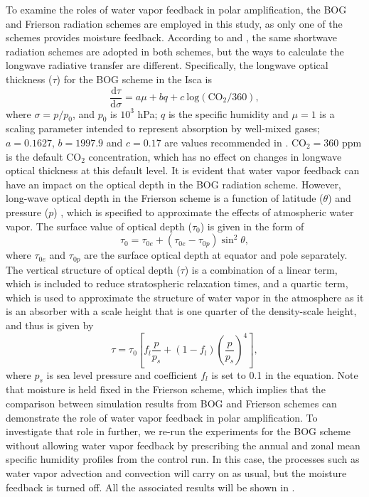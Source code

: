 To examine the roles of water vapor feedback in polar amplification, the BOG and Frierson radiation schemes are employed in this study, as only one of the schemes provides moisture feedback. According to \cite{Byrne2013} and \cite{Frierson2006}, the same shortwave radiation schemes are adopted in both schemes, but the ways to calculate the longwave radiative transfer are different. Specifically, the longwave optical thickness ($\tau$) for the BOG scheme in the Isca is
\begin{equation}\label{eq:bog_tau}
    \frac{\text{d}\tau}{\text{d}\sigma}=a\mu+bq+c~\text{log}(\text{CO}_2/360),
\end{equation}
where $\sigma = p/p_0$, and $p_0$ is $10^3$ hPa; $q$ is the specific humidity and $\mu=1$ is a scaling parameter intended to represent absorption by well-mixed gases; $a=0.1627$, $b=1997.9$ and $c=0.17$ are values recommended in \cite{Vallis2018}. CO$_2=360$ ppm is the default CO$_2$ concentration, which has no effect on changes in longwave optical thickness at this default level. It is evident that water vapor feedback can have an impact on the optical depth in the BOG radiation scheme. However, long-wave optical depth in the Frierson scheme is a function of latitude ($\theta$) and pressure ($p$) \citep{Frierson2006}, which is specified to approximate the effects of atmospheric water vapor. The surface value of optical depth ($\tau_0$) is given in the form of
\begin{equation}\label{eq:frierson_lw_optical_depth1}
\tau_0 = \tau_{0e}+(\tau_{0e}-\tau_{0p})\operatorname{sin}^2\theta,
\end{equation}
where $\tau_{0e}$ and $\tau_{0p}$ are the surface optical depth at equator and pole separately. The vertical structure of optical depth ($\tau$) is a combination of a linear term, which is included to reduce stratospheric relaxation times, and a quartic term, which is used to approximate the structure of water vapor in the atmosphere as it is an absorber with a scale height that is one quarter of the density-scale height, and thus is given by
\begin{equation}\label{eq:frierson_lw_optical_depth2}
\tau=\tau_0\left[f_l\frac{p}{p_s}+(1-f_l)\left(\frac{p}{p_s}\right)^4\right],
\end{equation}
where $p_s$ is sea level pressure and coefficient $f_l$ is set to 0.1 in the equation. Note that moisture is held fixed in the Frierson scheme, which implies that the comparison between simulation results from BOG and Frierson schemes can demonstrate the role of water vapor feedback in polar amplification. To investigate that role in further, we re-run the experiments for the BOG scheme without allowing water vapor feedback by prescribing the annual and zonal mean specific humidity profiles from the control run. In this case, the processes such as water vapor advection and convection will carry on as usual, but the moisture feedback is turned off. All the associated results will be shown in .

